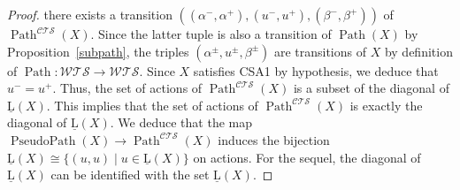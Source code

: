 \documentclass[a4paper,12pt]{amsart}
\begin{document}
\begin{proof}
there exists a transition
$((\alpha^-,\alpha^+),(u^-,u^+),(\beta^-,\beta^+))$ of
$\operatorname{{Path}}^{\mathcal{C\!T\!S}}(X)$. Since the latter tuple is also a transition of
$\operatorname{{Path}}(X)$ by Proposition~\ref{subpath}, the triples
$(\alpha^\pm,u^\pm,\beta^\pm)$ are transitions of $X$ by definition of
$\operatorname{{Path}}:{\mathcal{W\!T\!S}} \to {\mathcal{W\!T\!S}}$. Since $X$ satisfies CSA1 by hypothesis, we
deduce that $u^-=u^+$. Thus, the set of actions of $\operatorname{{Path}}^{\mathcal{C\!T\!S}}(X)$
is a subset of the diagonal of $\operatorname{\underline{L}}(X)$. This implies that the set of
actions of $\operatorname{{Path}}^{\mathcal{C\!T\!S}}(X)$ is exactly the diagonal of $\operatorname{\underline{L}}(X)$.  We
deduce that the map $\operatorname{{PseudoPath}}(X) \to \operatorname{{Path}}^{\mathcal{C\!T\!S}}(X)$ induces the
bijection $\operatorname{\underline{L}}(X) {\cong} \{(u,u)\mid u\in \operatorname{\underline{L}}(X)\}$ on actions. For the
sequel, the diagonal of $\operatorname{\underline{L}}(X)$ can be identified with the set
$\operatorname{\underline{L}}(X)$.


\end{proof}
\end{document}
